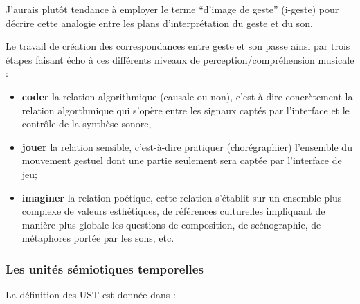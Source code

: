 J'aurais plutôt tendance à employer le terme ``d'image de geste'' (i-geste) pour décrire cette analogie entre les plans d'interprétation du geste et du son.

Le travail de création des correspondances entre geste et son passe ainsi par trois étapes faisant écho à ces différents niveaux de perception/compréhension musicale :
\vspace{-1em}
\begin{itemize}[noitemsep]
\item \textbf{coder} la relation algorithmique (causale ou non), c'est-à-dire concrètement la relation algorthmique qui s'opère entre les signaux captés par l'interface et le contrôle de la synthèse sonore, 
\item\textbf{jouer} la relation sensible, c'est-à-dire pratiquer (chorégraphier) l'ensemble du mouvement gestuel dont une partie seulement sera captée par l'interface de jeu;
\item\textbf{imaginer} la relation poétique, cette relation s'établit sur un ensemble plus complexe de valeurs esthétiques, de références culturelles impliquant de manière plus globale les questions de composition, de scénographie, de métaphores portée par les sons, etc.
\end{itemize}




\subsubsection{Les unités sémiotiques temporelles}

La définition des UST est donnée dans \cite{timsit-berthier_les_2004}:



